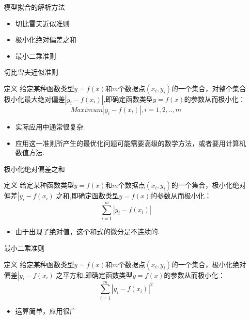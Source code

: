 \documentclass[mathserif]{beamer}
\begin{document}
\begin{frame}{模型拟合的解析方法}
  \begin{itemize}
  \item 切比雪夫近似准则
  \item 极小化绝对偏差之和
  \item 最小二乘准则
  \end{itemize}
\end{frame}

\begin{frame}{切比雪夫近似准则}
  \begin{block}{定义}
    给定某种函数类型$y=f(x)$和$m$个数据点$(x_i, y_i)$的一个集合，对整个集合极小化最大绝对偏差$|y_i - f(x_i)|$,即确定函数类型$y=f(x)$的参数从而极小化：
    \[
    Maximum |y_i - f(x_i)|,  i = 1, 2, .., m
    \]
  \end{block}

  \begin{itemize}
  \item 实际应用中通常很复杂.
  \item 应用这一准则所产生的最优化问题可能需要高级的数学方法，或者要用计算机数值方法.
  \end{itemize}

\end{frame}

\begin{frame}{极小化绝对偏差之和}
    \begin{block}{定义}
    给定某种函数类型$y=f(x)$和$m$个数据点$(x_i, y_i)$的一个集合，极小化绝对偏差$|y_i - f(x_i)|$之和,即确定函数类型$y=f(x)$的参数从而极小化：
    \[
    \sum_{i=1}^m |y_i - f(x_i)|
    \]
  \end{block}

  \begin{itemize}
  \item 由于出现了绝对值，这个和式的微分是不连续的.
  \end{itemize}

\end{frame}

\begin{frame}{最小二乘准则}
    \begin{block}{定义}
    给定某种函数类型$y=f(x)$和$m$个数据点$(x_i, y_i)$的一个集合，极小化绝对偏差$|y_i - f(x_i)|$之平方和,即确定函数类型$y=f(x)$的参数从而极小化：
    \[
    \sum_{i=1}^m |y_i - f(x_i)|^2
    \]
  \end{block}

  \begin{itemize}
  \item 运算简单，应用很广
  \end{itemize}
  
\end{frame}
\end{document}
